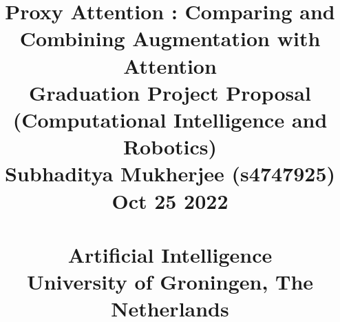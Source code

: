 \documentclass[a4paper,12pt]{article}
\begin{document}
\pagestyle{body}


\title{
    \vspace{1cm}
        {\bf
        {\Huge Proxy Attention : Comparing and Combining Augmentation with Attention\\
        }
        }
        \vspace{4mm}Graduation Project Proposal\\(Computational Intelligence and Robotics)\\
        \vspace{4mm}Subhaditya Mukherjee (s4747925)\\Oct 25 2022\\
        \vspace{10cm}{\LARGE Internal Supervisor(s): S.H. Mohades Kasaei, PhD (Artificial Intelligence, University of Groningen)}\\
        {\bf {Artificial Intelligence\\University of Groningen, The Netherlands}}
}
\date{}

\maketitle
\thispagestyle{titlepage}





    
\end{document}
